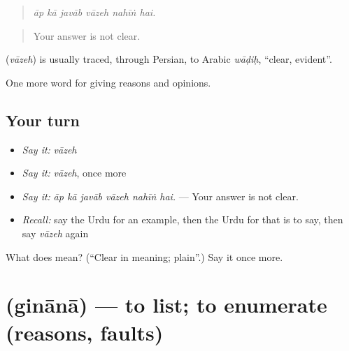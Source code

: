 \begin{quote}
     
\end{quote}

\begin{quote}
\emph{āp kā javāb vāzeh nahīṅ hai.}
\end{quote}

\begin{quote}
Your answer is not clear.
\end{quote}

\begin{cousinweb}
\textbf{} (\emph{vāzeh}) is usually traced, through Persian, to Arabic \emph{wāḍiḥ}, \textquotedblleft{}clear, evident\textquotedblright{}.
\end{cousinweb}

\begin{grammarlens}[title={What you've built}]
One more word for giving reasons and opinions.
\end{grammarlens}

\subsection*{Your turn}
\begin{itemize}
\raggedright
  \item \emph{Say it:} \emph{vāzeh}
  \item \emph{Say it:} \emph{vāzeh}, once more
  \item \emph{Say it:} \emph{āp kā javāb vāzeh nahīṅ hai.} — Your answer is not clear.
  \item \emph{Recall:} say the Urdu for an example, then the Urdu for that is to say, then say \emph{vāzeh} again
\end{itemize}

\begin{tcolorbox}[breakable,colback=teal!4,colframe=teal!35!black,title={Before you move on}]
What does  mean? (\textquotedblleft{}Clear in meaning; plain\textquotedblright{}.) Say it once more.
\end{tcolorbox}
\section[\texorpdfstring{\ur{گنانا} (ginānā)}{گنانا (ginānā)}]{ (ginānā) — to list; to enumerate (reasons, faults)}

\label{lesson:UR-C338-ginana}



